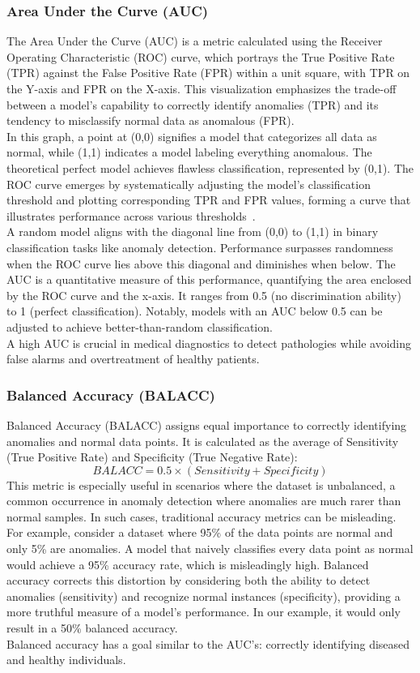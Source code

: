 \subsubsection{Area Under the Curve (AUC)}
The Area Under the Curve (AUC) is a metric calculated using the Receiver Operating Characteristic (ROC) curve, which portrays the True Positive Rate (TPR) against the False Positive Rate (FPR) within a unit square, with TPR on the Y-axis and FPR on the X-axis. This visualization emphasizes the trade-off between a model's capability to correctly identify anomalies (TPR) and its tendency to misclassify normal data as anomalous (FPR).\\
In this graph, a point at (0,0) signifies a model that categorizes all data as normal, while (1,1) indicates a model labeling everything anomalous. The theoretical perfect model achieves flawless classification, represented by (0,1). The ROC curve emerges by systematically adjusting the model's classification threshold and plotting corresponding TPR and FPR values, forming a curve that illustrates performance across various thresholds~\cite{fawcett2006introduction}.\\
A random model aligns with the diagonal line from (0,0) to (1,1) in binary classification tasks like anomaly detection. Performance surpasses randomness when the ROC curve lies above this diagonal and diminishes when below. The AUC is a quantitative measure of this performance, quantifying the area enclosed by the ROC curve and the x-axis. It ranges from 0.5 (no discrimination ability) to 1 (perfect classification). Notably, models with an AUC below 0.5 can be adjusted to achieve better-than-random classification.\\
A high AUC is crucial in medical diagnostics to detect pathologies while avoiding false alarms and overtreatment of healthy patients.

\subsubsection{Balanced Accuracy (BALACC)}
Balanced Accuracy (BALACC) assigns equal importance to correctly identifying anomalies and normal data points. It is calculated as the average of Sensitivity (True Positive Rate) and Specificity (True Negative Rate):
\[ BALACC=0.5 \times (Sensitivity + Specificity) \]
This metric is especially useful in scenarios where the dataset is unbalanced, a common occurrence in anomaly detection where anomalies are much rarer than normal samples. In such cases, traditional accuracy metrics can be misleading. For example, consider a dataset where 95\% of the data points are normal and only 5\% are anomalies. A model that naively classifies every data point as normal would achieve a 95\% accuracy rate, which is misleadingly high. Balanced accuracy corrects this distortion by considering both the ability to detect anomalies (sensitivity) and recognize normal instances (specificity), providing a more truthful measure of a model's performance. In our example, it would only result in a 50\% balanced accuracy.\\
Balanced accuracy has a goal similar to the AUC's: correctly identifying diseased and healthy individuals.



